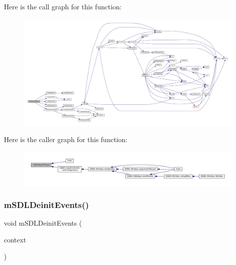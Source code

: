 Here is the call graph for this function\+:
\nopagebreak
\begin{figure}[H]
\begin{center}
\leavevmode
\includegraphics[width=350pt]{sdl-events_8c_acddd18a03f8a08870ffb4e369814425f_cgraph}
\end{center}
\end{figure}
Here is the caller graph for this function\+:
\nopagebreak
\begin{figure}[H]
\begin{center}
\leavevmode
\includegraphics[width=350pt]{sdl-events_8c_acddd18a03f8a08870ffb4e369814425f_icgraph}
\end{center}
\end{figure}
\mbox{\label{sdl-events_8c_a619d2db362c7cc68e86f0428afc773c9}} 
\subsubsection{\texorpdfstring{m\+S\+D\+L\+Deinit\+Events()}{mSDLDeinitEvents()}}
{\footnotesize\ttfamily void m\+S\+D\+L\+Deinit\+Events (\begin{DoxyParamCaption}\item[{struct \mbox{\hyperlink{sdl-events_8h_structm_s_d_l_events}{m\+S\+D\+L\+Events}} $\ast$}]{context }\end{DoxyParamCaption})}

